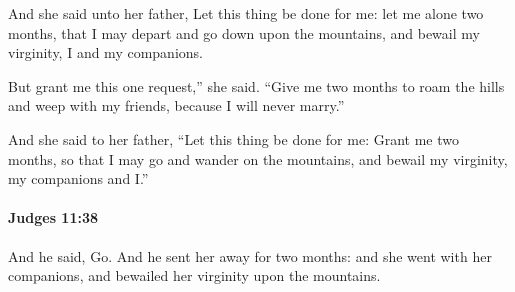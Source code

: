 			\begin{versebox}
					\item[BHS] 
					\item[ASV] And she said unto her father, Let this thing be done for me: let me alone two months, that I may depart and go down upon the mountains, and bewail my virginity, I and my companions.
					\item[NIV] But grant me this one request,” she said. “Give me two months to roam the hills and weep with my friends, because I will never marry.”
					\item[NRSV] And she said to her father, “Let this thing be done for me: Grant me two months, so that I may go and wander on the mountains, and bewail my virginity, my companions and I.”
			\end{versebox}

		\paragraph{Judges 11:38} %
			\label{JUDGES-11-38}

			And he said, Go. And he sent her away for two months: and she went with her companions, and bewailed her virginity upon the mountains.

